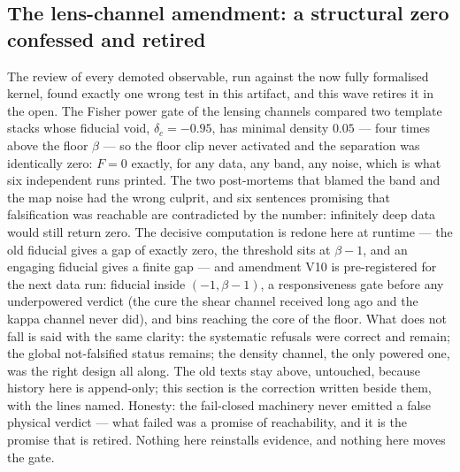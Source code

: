\documentclass[11pt]{article}
\theoremstyle{definition}\newtheorem{deriv}{Derivation}
\begin{document}
\subsection*{The lens-channel amendment: a structural zero confessed and retired}The review of every demoted observable, run against the now fully formalised kernel, found exactly one wrong test in this artifact, and this wave retires it in the open. The Fisher power gate of the lensing channels compared two template stacks whose fiducial void, $\delta_c=-0.95$, has minimal density $0.05$ --- four times above the floor $\beta$ --- so the floor clip never activated and the separation was identically zero: $F=0$ exactly, for any data, any band, any noise, which is what six independent runs printed. The two post-mortems that blamed the band and the map noise had the wrong culprit, and six sentences promising that falsification was reachable are contradicted by the number: infinitely deep data would still return zero. The decisive computation is redone here at runtime --- the old fiducial gives a gap of exactly zero, the threshold sits at $\beta-1$, and an engaging fiducial gives a finite gap --- and amendment V10 is pre-registered for the next data run: fiducial inside $(-1,\beta-1)$, a responsiveness gate before any underpowered verdict (the cure the shear channel received long ago and the kappa channel never did), and bins reaching the core of the floor. What does not fall is said with the same clarity: the systematic refusals were correct and remain; the global not-falsified status remains; the density channel, the only powered one, was the right design all along. The old texts stay above, untouched, because history here is append-only; this section is the correction written beside them, with the lines named. Honesty: the fail-closed machinery never emitted a false physical verdict --- what failed was a promise of reachability, and it is the promise that is retired. Nothing here reinstalls evidence, and nothing here moves the gate.
\end{document}
